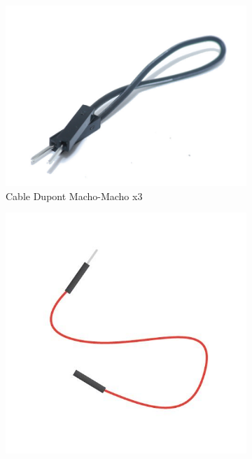 \documentclass{article}
\begin{document}
\begin{figure}[!ht]
	\centering
	\begin{subfigure}[b]{0.3\textwidth}
		\includegraphics[width=\textwidth]{../images/cable_mm.jpg}
		\caption*{Cable Dupont Macho-Macho x3}
		\label{fig:cable mm}
	\end{subfigure}
	\hfill
	\begin{subfigure}[b]{0.3\textwidth}
		\includegraphics[width=\textwidth]{../images/cable_mh.jpg}

\end{subfigure}
\end{figure}
\end{document}
